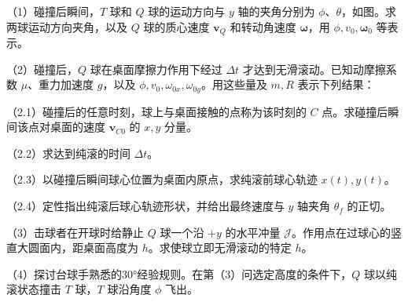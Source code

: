 \documentclass[12pt,a4paper,fontset=fandol]{ctexart}
\begin{document}
（1）碰撞后瞬间，\(T\) 球和 \(Q\) 球的运动方向与 \(y\) 轴的夹角分别为
\(\phi\)、\(\theta\)，如图。求两球运动方向夹角，以及 \(Q\) 球的质心速度
\(\boldsymbol v_Q\) 和转动角速度 \(\boldsymbol\omega\)，用
\(\phi,v_0,\boldsymbol\omega_0\) 等表示。

（2）碰撞后，\(Q\) 球在桌面摩擦力作用下经过 \(\Delta t\)
才达到无滑滚动。已知动摩擦系数 \(\mu\)、重力加速度 \(g\)，以及
\(\phi,v_0,\omega_{0x},\omega_{0y}\)。用这些量及 \(m,R\) 表示下列结果：

（2.1）碰撞后的任意时刻，球上与桌面接触的点称为该时刻的 \(C\)
点。求碰撞后瞬间该点对桌面的速度 \(\boldsymbol v_{C0}\) 的 \(x,y\)
分量。

（2.2）求达到纯滚的时间 \(\Delta t\)。

（2.3）以碰撞后瞬间球心位置为桌面内原点，求纯滚前球心轨迹
\(x(t),y(t)\)。

（2.4）定性指出纯滚后球心轨迹形状，并给出最终速度与 \(y\) 轴夹角
\(\theta_f\) 的正切。

\clearpage

（3）击球者在开球时给静止 \(Q\) 球一个沿 \(+y\) 的水平冲量
\(\mathcal J\)。作用点在过球心的竖直大圆面内，距桌面高度为
\(h\)。求使球立即无滑滚动的特定 \(h\)。

\begin{center}
\begin{minipage}{\linewidth}
\centering\begingroup
{}
\ifdim\wd\diagrambox>.88\linewidth
\sbox{\diagrambox}{\resizebox{.88\linewidth}{!}{\usebox{\diagrambox}}}
\fi
\ifdim\ht\diagrambox>.40\textheight
\resizebox{!}{.40\textheight}{\usebox{\diagrambox}}
\else\usebox{\diagrambox}\fi
\par{}
\endgroup\end{minipage}
\end{center}

（4）探讨台球手熟悉的30°经验规则。在第（3）问选定高度的条件下，\(Q\)
球以纯滚状态撞击 \(T\) 球，\(T\) 球沿角度 \(\phi\) 飞出。
\end{document}
